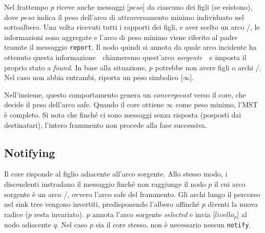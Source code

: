 \documentclass[target=bach,aauheader=,style=]{thud}
\newcommand{\eng}[1]{\foreignlanguage{english}{#1}}
\begin{document}
Nel frattempo $p$ riceve anche messaggi [$peso$] da ciascuno dei figli (se esistono), dove $peso$ indica il peso dell'arco di attraversamento minimo individuato nel sottoalbero. Una volta ricevuti tutti i rapporti dei figli, e aver scelto un arco \undecided/, le informazioni sono aggregate e l'arco di peso minimo viene riferito al padre tramite il messaggio \lstinline{report}. Il nodo quindi si annota da quale arco incidente ha ottenuto questa informazione  \,\textendash\, chiameremo quest'arco \emph{sorgente} \,\textendash\, e imposta il proprio stato a \emph{\eng{found}}. In base alla situazione, $p$ potrebbe non avere figli o archi \undecided/. Nel caso non abbia entrambi, riporta un peso simbolico [$\infty$].

Nell'insieme, questo comportamento genera un \emph{\eng{convergecast}} verso il core, che decide il peso dell'arco \eng{safe}. Quando il core ottiene $\infty$ come peso minimo, l'MST è completo. Si nota che finché ci sono messaggi  senza risposta (posposti dai destinatari), l'intero frammento non procede alla fase successiva.

\subsection{\eng{Notifying}}
Il core risponde  al figlio adiacente all'arco sorgente. Allo stesso modo, i discendenti instradano il messaggio finché non raggiunge il nodo $p$ il cui arco sorgente è un arco \undecided/, ovvero l'arco \eng{safe} del frammento. Gli archi lungo il percorso nel \eng{sink tree} vengono invertiti, predisponendo l'albero affinché $p$ diventi la nuova radice ($p$ resta invariato). $p$ annota l'arco sorgente \emph{\eng{selected}} e invia [$livello_p$] al nodo adiacente $q$. Nel caso $p$ sia il core stesso, non è necessario nessun \lstinline{notify}.
\end{document}

